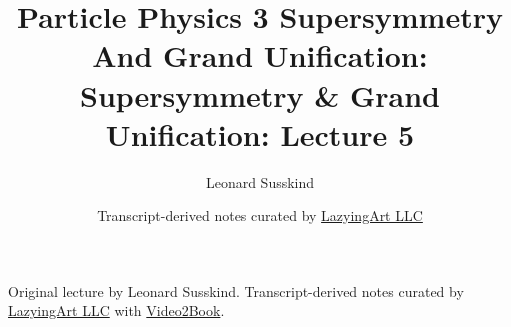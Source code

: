 \documentclass[11pt,oneside]{book}
\begin{document}
\frontmatter
\title{Particle Physics 3 Supersymmetry And Grand Unification: Supersymmetry \& Grand Unification: Lecture 5}
\author{Leonard Susskind}
\date{Transcript-derived notes curated by \href{https://lazying.art}{LazyingArt LLC}}
\maketitle
\begin{center}
\small Original lecture by Leonard Susskind. Transcript-derived notes curated by \href{https://lazying.art}{LazyingArt LLC} with \href{https://github.com/lachlanchen/Video2Book}{Video2Book}.
\end{center}
\clearpage
\mainmatter

\end{document}
